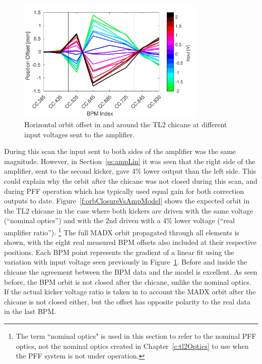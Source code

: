 \begin{figure}
  \centering
  \includegraphics[width=0.8\textwidth]{Figures/commissioning/HOrbitVsInput}
  \caption{Horizontal orbit offset in and around the TL2 chicane at different input voltages sent to the amplifier.}
  \label{f:HOrbitVsInput}
\end{figure}

During this scan the input sent to both sides of the amplifier was the same magnitude. However, in Section~\ref{ss:ampLin} it was seen that the right side of the amplifier, sent to the second kicker, gave 4\% lower output than the left side. This could explain why the orbit after the chicane was not closed during this scan, and during PFF operation which has typically used equal gain for both correction outputs to date. Figure~\ref{f:orbClosureVsAmpModel} shows the expected orbit in the TL2 chicane in the case where both kickers are driven with the same voltage (``nominal optics'') and with the 2nd driven with a 4\% lower voltage (``real amplifier ratio'').
\footnote{The term ``nominal optics" is used in this section to refer to the nominal PFF optics, not the nominal optics created in Chapter~\ref{c:tl2Optics} to use when the PFF system is not under operation.}
The full MADX orbit propagated through all elements is shown, with the eight real measured BPM offsets also included at their respective positions. Each BPM point represents the gradient of a linear fit using the variation with input voltage seen previously in Figure~\ref{f:HOrbitVsInput}. Before and inside the chicane the agreement between the BPM data and the model is excellent. As seen before, the BPM orbit is not closed after the chicane, unlike the nominal optics. If the actual kicker voltage ratio is taken in to account the MADX orbit after the chicane is not closed either, but the offset has opposite polarity to the real data in the last BPM.

